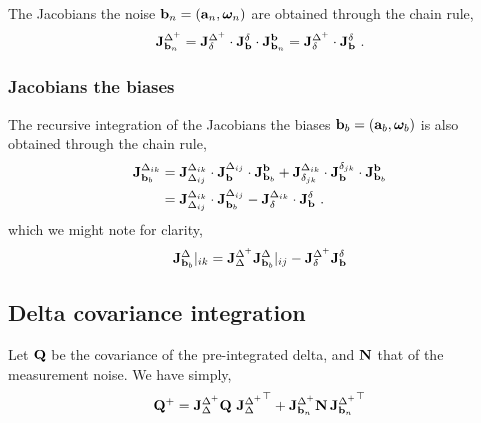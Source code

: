 The Jacobians \wrt the noise ${\bf b}_n=({\bf a}_n,{{\bm \omega}}_n)$ are obtained through the chain rule,
%
\begin{align}
{{\bf J}^{\Delta^+}_{{\bf b}_n}} = {{\bf J}^{\Delta^+}_{\delta}} \cdot {{\bf J}^{\delta}_{{\bf b}}} \cdot {{\bf J}^{{\bf b}}_{{\bf b}_n}} = {{\bf J}^{\Delta^+}_{\delta}} \cdot {{\bf J}^{\delta}_{{\bf b}}}
~.
\end{align}
%


\subsubsection{Jacobians \wrt the biases}

The recursive integration of the Jacobians \wrt the biases ${\bf b}_b=({\bf a}_b,{{\bm \omega}}_b)$ is also obtained through the chain rule,
%
\begin{align*}
{{\bf J}^{\Delta_{ik}}_{{\bf b}_b}} 
&= 
{{\bf J}^{\Delta_{ik}}_{\Delta_{ij}}} \cdot {{\bf J}^{\Delta_{ij}}_{{\bf b}}} \cdot {{\bf J}^{{\bf b}}_{{\bf b}_b}} 
+ 
{{\bf J}^{\Delta_{ik}}_{\delta_{jk}}} \cdot {{\bf J}^{\delta_{jk}}_{{\bf b}}} \cdot {{\bf J}^{{\bf b}}_{{\bf b}_b}} \\
&= {{\bf J}^{\Delta_{ik}}_{\Delta_{ij}}} \cdot {{\bf J}^{\Delta_{ij}}_{{\bf b}_b}} - {{\bf J}^{\Delta_{ik}}_{\delta}} \cdot {{\bf J}^{\delta}_{{\bf b}}}
~.
\end{align*}
%
which we might note for clarity,
%
\begin{align}
{{\bf J}^{\Delta}_{{\bf b}_b}}|_{ik} = {{\bf J}^{\Delta^+}_{\Delta}}{{\bf J}^{\Delta}_{{\bf b}_b}}|_{ij} - {{\bf J}^{\Delta^+}_{\delta}}{{\bf J}^{\delta}_{{\bf b}}}
\end{align}


\subsection{Delta covariance integration}
Let ${\bf Q}$ be the covariance of the pre-integrated delta, and ${\bf N}$ that of the measurement noise. We have simply,
%
\begin{align}
{\bf Q}^+ = {{\bf J}^{\Delta^+}_{\Delta}}{\bf Q}\,\,{{\bf J}^{\Delta^+}_{\Delta}}^{\top} + {{\bf J}^{\Delta^+}_{{\bf b}_n}}{\bf N}\,{{\bf J}^{\Delta^+}_{{\bf b}_n}}^{\top}
\end{align}

